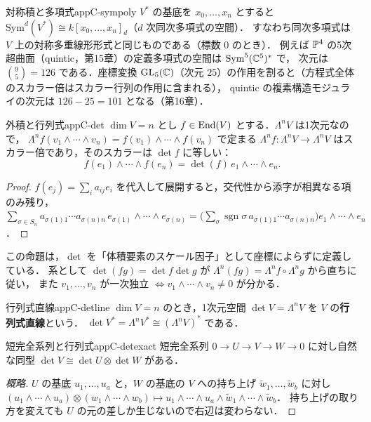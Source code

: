 \begin{myex}{対称積と多項式}{appC-sympoly}
$V^*$ の基底を $x_0,\dots,x_n$ とすると $\mathrm{Sym}^d(V^*)\cong k[x_0,\dots,x_n]_d$（$d$ 次同次多項式の空間）．
すなわち同次多項式は $V$ 上の対称多重線形形式と同じものである（標数 $0$ のとき）．
例えば $\mathbb{P}^4$ の5次超曲面（quintic，第15章）の定義多項式の空間は $\mathrm{Sym}^5(\mathbb{C}^5)^*$ で，
次元は $\binom{9}{5}=126$ である．座標変換 $\operatorname{GL}_5(\mathbb{C})$（次元 $25$）の作用を割ると（方程式全体のスカラー倍はスカラー行列の作用に含まれる），
quintic の複素構造モジュライの次元は $126-25=101$ となる（第16章）．
\end{myex}

\begin{myprop}{外積と行列式}{appC-det}
$\dim V=n$ とし $f\in\operatorname{End}(V)$ とする．$\Lambda^nV$ は1次元なので，
$\Lambda^nf(v_1\wedge\cdots\wedge v_n)=f(v_1)\wedge\cdots\wedge f(v_n)$ で定まる
$\Lambda^nf\colon\Lambda^nV\to\Lambda^nV$ はスカラー倍であり，そのスカラーは $\det f$ に等しい：
\[
f(e_1)\wedge\cdots\wedge f(e_n)=\det(f)\,e_1\wedge\cdots\wedge e_n .
\]
\end{myprop}
\begin{proof}
$f(e_j)=\sum_ia_{ij}e_i$ を代入して展開すると，交代性から添字が相異なる項のみ残り，
$\sum_{\sigma\in S_n}a_{\sigma(1)1}\cdots a_{\sigma(n)n}\,e_{\sigma(1)}\wedge\cdots\wedge e_{\sigma(n)}
=\bigl(\sum_\sigma\operatorname{sgn}\sigma\,a_{\sigma(1)1}\cdots a_{\sigma(n)n}\bigr)e_1\wedge\cdots\wedge e_n$．
\end{proof}

この命題は，$\det$ を「体積要素のスケール因子」として座標によらずに定義している．
系として $\det(fg)=\det f\det g$ が $\Lambda^n(fg)=\Lambda^nf\circ\Lambda^ng$ から直ちに従い，
また $v_1,\dots,v_n$ が一次独立 $\iff v_1\wedge\cdots\wedge v_n\ne0$ が分かる．

\begin{mydef}{行列式直線}{appC-detline}
$\dim V=n$ のとき，1次元空間 $\det V=\Lambda^nV$ を $V$ の\textbf{行列式直線}という．
$\det V^*=\Lambda^nV^*\cong(\Lambda^nV)^*$ である．
\end{mydef}

\begin{myprop}{短完全系列と行列式}{appC-detexact}
短完全系列 $0\to U\to V\to W\to0$ に対し自然な同型 $\det V\cong\det U\otimes\det W$ がある．
\end{myprop}
\begin{proof}[概略]
$U$ の基底 $u_1,\dots,u_a$ と，$W$ の基底の $V$ への持ち上げ $\tilde w_1,\dots,\tilde w_b$ に対し
$(u_1\wedge\cdots\wedge u_a)\otimes(w_1\wedge\cdots\wedge w_b)\mapsto u_1\wedge\cdots\wedge u_a\wedge\tilde w_1\wedge\cdots\wedge\tilde w_b$．
持ち上げの取り方を変えても $U$ の元の差しか生じないので右辺は変わらない．
\end{proof}

